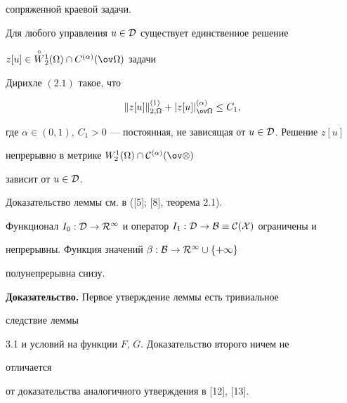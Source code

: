 сопряженной краевой задачи. 


 


\begin{lems} 


Для любого управления $u\in\cal D$ существует единственное решение 


$z[u]\in\up{\circ}{W}^1_2(\Omega)\cap C^{(\alpha)}(\ov\Omega)$ задачи 


Дирихле $(2.1)$ такое, что 


$$ 


\|z[u]\|^{(1)}_{2,\Omega}+|z[u]|^{(\alpha)}_{\ov\Omega}\le C_1, 


$$ 


где $\alpha\in(0,1)$, $C_1>0$ --- постоянная, не зависящая от $u\in\cal 


D$. Решение $z[u]$ 


непрерывно в метрике $W^1_2(\Omega)\cap\cal C^{(\alpha)}(\ov\Omega)$ 


зависит от $u\in\cal D$. 


\end{lems} 


 


Доказательство леммы см. в ([5]; [8], теорема 2.1). 


 


\begin{lems} 


Функционал $I_0:\cal D\to R^1$ и оператор $I_1:\cal D\to\cal B\equiv 


C(X)$ ограничены и 


непрерывны. Функция значений $\beta:\cal B\to R^1\cup\{+\infty\}$ 


полунепрерывна снизу. 


\end{lems} 


 


{\bf Доказательство.} Первое утверждение леммы есть тривиальное 


следствие леммы 


3.1 и условий на функции $F$, $G$. Доказательство второго ничем не 


отличается 


от доказательства аналогичного утверждения в [12], [13]. 


 



